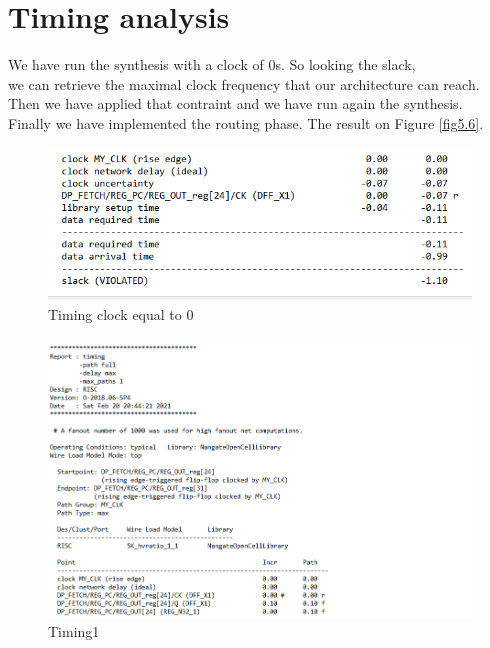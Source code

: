 \section{Timing analysis}
We have run the synthesis with a clock of 0s. So looking the slack,\\
we can retrieve the maximal clock frequency that our architecture can reach.
Then we have applied that contraint and we have run again the synthesis.\\
Finally we have implemented the routing phase. The result on Figure \ref{fig5.6}.
\begin{figure}[h!]
	\centering
	\includegraphics[width=18cm]{./images/RISC_tim0}
	\caption{Timing clock equal to 0}
	\label{fig5.2}
\end{figure}
\begin{figure}[h!]
	\centering
	\includegraphics[width=20cm]{./images/RISC_tim1}
	\caption{Timing1}
	\label{fig5.3}
\end{figure}
